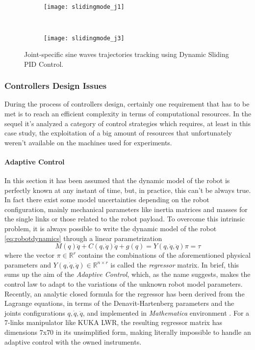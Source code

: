\begin{figure}[H]
	\centering
	\begin{subfigure}[t]{\textwidth}
		\texttt{[image: slidingmode\_j1]}
	\end{subfigure}
	\\
	\begin{subfigure}[t]{\textwidth}
		\texttt{[image: slidingmode\_j3]}
	\end{subfigure}
	\caption{Joint-specific sine waves trajectories tracking using Dynamic Sliding PID Control.}
\end{figure}

\subsubsection{Controllers Design Issues}
During the process of controllers design, certainly one requirement that has to be met is to reach an efficient complexity in terms of computational resources. In the sequel it's analyzed a category of control strategies which requires, at least in this case study, the exploitation of a big amount of resources that unfortunately weren't available on the machines used for experiments.

\paragraph{Adaptive Control}
In this section it has been assumed that the dynamic model of the robot is perfectly known at any instant of time, but, in practice, this can't be always true. In fact there exist some model uncertainties depending on the robot configuration, mainly mechanical parameters like inertia matrices and masses for the single links or those related to the robot payload. To overcome this intrinsic problem, it is always possible to write the dynamic model of the robot \eqref{eq:robotdynamics} through a linear parametrization
\begin{equation}
M(q)\ddot{q} + C(q,\dot{q})\dot{q} + g(q) = Y(q,\dot{q},\ddot{q})\pi = \tau
\end{equation}
where the vector $\pi\in\mathbb{R}^r$ contains the combinations of the aforementioned physical parameters and $Y(q,\dot{q},\ddot{q})\in\mathbb{R}^{n\times r}$ is called the \textit{regressor} matrix. In brief, this sums up the aim of the \textit{Adaptive Control}, which, as the name suggests, makes the control law to adapt to the variations of the unknown robot model parameters. Recently, an analytic closed formula for the regressor has been derived from the Lagrange equations, in terms of the Denavit-Hartenberg parameters and the joints configurations  $q,\dot{q},\ddot{q}$, and implemented in \textit{Mathematica} environment \cite{gabiccini09}. For a 7-links manipulator like KUKA LWR, the resulting regressor matrix has dimensions $7$x$70$ in its unsimplified form, making literally impossible to handle an adaptive control with the owned instruments.

